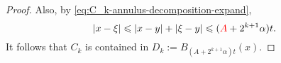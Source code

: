 \documentclass{amsart}
\theoremstyle{remark}
\renewcommand{\leq}{\leqslant}
\renewcommand{\leq}{\leqslant}
\newcommand{\R}{\mathbf R}
\newcommand{\e}{\mathrm{e}} %
\renewcommand{\leq}{\leqslant}%
\newcommand{\red}{\color{red}}
\begin{document}
\begin{proof}

  Also, by \eqref{eq:C_k-annulus-decomposition-expand},
  \begin{equation*}
    |x - \xi| \leq |x - y| + |\xi - y| \leq ({\red A} + 2^{k + 1}\alpha)t .
  \end{equation*}
  It follows that $ C_k$ is contained in $D_k := B_{(A +2^{k + 1}\alpha)t}(x)$.


\end{proof}
\end{document}
